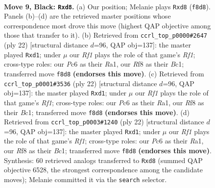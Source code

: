 \documentclass[11pt]{article}
\begin{document}
\clearpage

\begin{figure}[p]\centering
\begin{subfigure}{0.46\textwidth}\centering
\resizebox{\linewidth}{!}{%
\newchessgame
\chessboard[
  setfen={rnbQ1rk1/pp3pbp/2p2np1/4p3/4P2P/2N2N2/PPP1BPP1/R1B2RK1 b - - 0 9},
  showmover=false,
  pgfstyle=straightmove, color=movearrow, markmove={f8-d8}
]}
\caption{}
\end{subfigure}\hfill
\begin{subfigure}{0.46\textwidth}\centering
\resizebox{\linewidth}{!}{%
\newchessgame
\chessboard[
  setfen={r1b2rk1/ppp2pbp/1nP3p1/8/4p3/2N1PNP1/PP3PBP/R1Bq1RK1 w - - 0 12},
  showmover=false,
  pgfstyle=straightmove, color=movearrow, markmove={f1-d1}
]}
\caption{}
\end{subfigure}
\\[4pt]
\begin{subfigure}{0.46\textwidth}\centering
\resizebox{\linewidth}{!}{%
\newchessgame
\chessboard[
  setfen={r1b2rk1/ppp2pbp/1nP3p1/8/4p3/2N1PNP1/PP3PBP/R1Bq1RK1 w - - 0 12},
  showmover=false,
  pgfstyle=straightmove, color=movearrow, markmove={f1-d1}
]}
\caption{}
\end{subfigure}\hfill
\begin{subfigure}{0.46\textwidth}\centering
\resizebox{\linewidth}{!}{%
\newchessgame
\chessboard[
  setfen={r1b2rk1/ppp2pbp/1nP3p1/8/4p3/2N1PNP1/PP3PBP/R1Bq1RK1 w - - 0 12},
  showmover=false,
  pgfstyle=straightmove, color=movearrow, markmove={f1-d1}
]}
\caption{}
\end{subfigure}
\caption{\textbf{Move 9, Black: \texttt{Rxd8}.} (a) Our position; Melanie plays \texttt{Rxd8} (\texttt{f8d8}). Panels (b)--(d) are the retrieved master positions whose correspondence most drove this move (highest QAP objective among those that transfer to it). (b) Retrieved from \texttt{ccrl\_top\_p0000\#2647} (ply 22) [structural distance $d$=96, QAP obj=137]: the master played \texttt{Rxd1}; under $\mu$ our \emph{Rf1} plays the role of that game's \emph{Rf1}; cross-type roles: our \emph{P}c6 as their \emph{R}a1, our \emph{R}f8 as their \emph{B}c1; transferred move \texttt{f8d8} \textbf{(endorses this move)}. (c) Retrieved from \texttt{ccrl\_top\_p0001\#3536} (ply 22) [structural distance $d$=96, QAP obj=137]: the master played \texttt{Rxd1}; under $\mu$ our \emph{Rf1} plays the role of that game's \emph{Rf1}; cross-type roles: our \emph{P}c6 as their \emph{R}a1, our \emph{R}f8 as their \emph{B}c1; transferred move \texttt{f8d8} \textbf{(endorses this move)}. (d) Retrieved from \texttt{ccrl\_top\_p0003\#1240} (ply 22) [structural distance $d$=96, QAP obj=137]: the master played \texttt{Rxd1}; under $\mu$ our \emph{Rf1} plays the role of that game's \emph{Rf1}; cross-type roles: our \emph{P}c6 as their \emph{R}a1, our \emph{R}f8 as their \emph{B}c1; transferred move \texttt{f8d8} \textbf{(endorses this move)}. Synthesis: 60 retrieved analogs transferred to \texttt{Rxd8} (summed QAP objective 6528, the strongest correspondence among the candidate moves); Melanie committed it via the \texttt{search} selector.}
\label{fig:thought-m17}
\end{figure}
\end{document}
